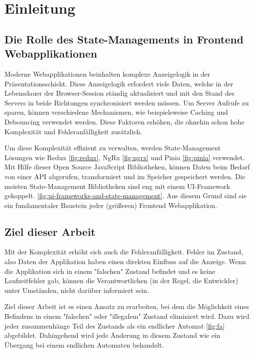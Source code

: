 \chapter{Einleitung}

\section{Die Rolle des State-Managements in Frontend Webapplikationen}

Moderne Webapplikationen beinhalten komplexe Anzeigelogik in der Präsentationsschicht. Diese Anzeigelogik erfordert viele Daten, welche in der Lebensdauer der Browser-Session ständig aktualisiert und mit den Stand des Servers in beide Richtungen synchronisiert werden müssen. Um Server Aufrufe zu sparen, können verschiedene Mechanismen, wie beispielsweise Caching und Debouncing verwendet werden. Diese Faktoren erhöhen, die ohnehin schon hohe Komplexität und Fehleranfälligkeit zusätzlich.

Um diese Komplexität effizient zu verwalten, werden State-Management Lösungen wie Redux \ref{fig:redux}, NgRx \ref{fig:ngrx} und Pinia \ref{fig:pinia} verwendet. Mit Hilfe dieser Open Source JavaScript Bibliotheken, können Daten beim Bedarf von einer API abgerufen, transformiert und im Speicher gespeichert werden. Die meisten State-Management Bibliotheken sind eng mit einem UI-Framework gekoppelt. \ref{fig:ui-frameworks-and-state-management}. Aus diesem Grund sind sie ein fundamentaler Baustein jeder (größeren) Frontend Webapplikation.

\section{Ziel dieser Arbeit}

Mit der Komplexität erhöht sich auch die Fehleranfälligkeit. Fehler im Zustand, also Daten der Applikation haben einen direkten Einfluss auf die Anzeige. Wenn die Applikation sich in einem "falschen" Zustand befindet und es keine Laufzeitfehler gab, können die Verantwortlichen (in der Regel, die Entwickler) unter Umständen, nicht darüber informiert sein. 

Ziel dieser Arbeit ist es einen Ansatz zu erarbeiten, bei dem die Möglichkeit eines Befindens in einem "falschen" oder "illegalem" Zustand eliminiert wird. Dazu wird jeder zusammenhänge Teil des Zustands als ein endlicher Automat \ref{fig:fa} abgebildet. Dahingehend wird jede Änderung in diesem Zustand wie ein Übergang bei einem endlichen Automaten behandelt.
